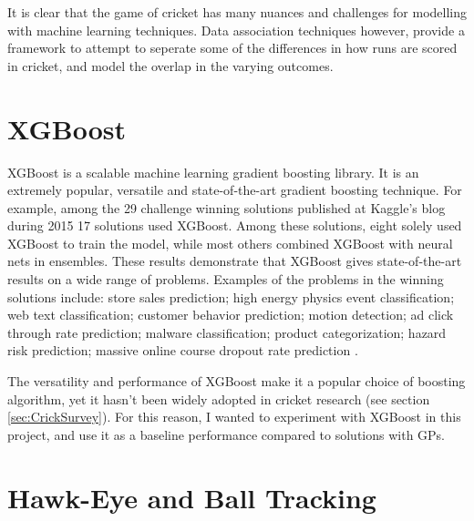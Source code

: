 \documentclass[12pt,a4paper]{report}
\theoremstyle{definition}
\begin{document}

It is clear that the game of cricket has many nuances and challenges for modelling with machine learning techniques. 
Data association techniques however, provide a framework to attempt to seperate some of the differences in how runs are scored in cricket, and model the overlap in the varying outcomes.

\section{XGBoost}

XGBoost is a scalable machine learning gradient boosting library.  
It is an extremely popular, versatile and state-of-the-art gradient boosting technique.
For example, among the 29 challenge winning solutions published at Kaggle’s blog during 2015 17 solutions used XGBoost.
Among these solutions, eight solely used XGBoost to train the model, while most others combined XGBoost with neural nets in ensembles.
These results demonstrate that XGBoost gives state-of-the-art results on a wide range of problems. 
Examples of the problems in the winning solutions include: store sales prediction; high energy physics event classification; web text classification; customer behavior prediction; motion detection; ad click through rate prediction; malware classification; product categorization; hazard risk prediction; massive online course dropout rate prediction \citep{Chen2016}.

The versatility and performance of XGBoost make it a popular choice of boosting algorithm, yet it hasn't been widely adopted in cricket research (see section \ref{sec:CrickSurvey}).
For this reason, I wanted to experiment with XGBoost in this project, and use it as a baseline performance compared to solutions with GPs.

\section{Hawk-Eye and Ball Tracking}
\end{document}
